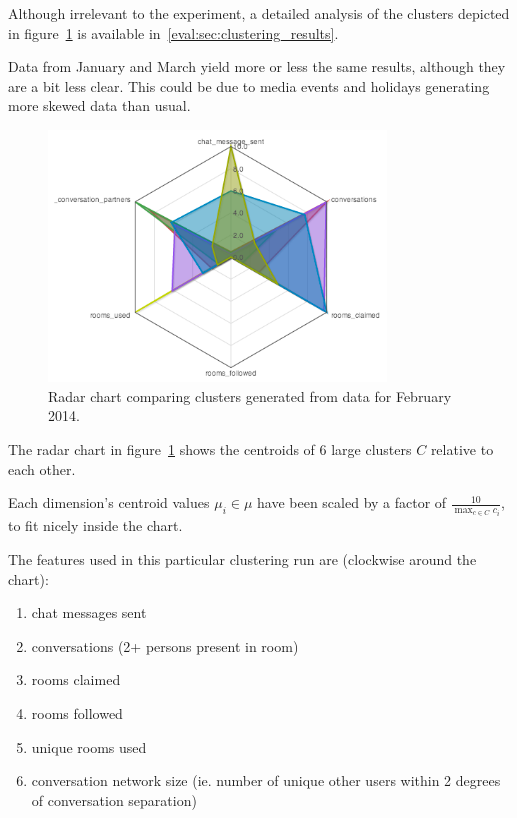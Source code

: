 Although irrelevant to the experiment, a detailed analysis of the clusters depicted in figure~\ref{fig:radar-clusters-february} is available in~\ref{eval:sec:clustering_results}.

Data from January and March yield more or less the same results, although they are a bit less clear. This could be due to media events and holidays generating more skewed data than usual.

\begin{figure}[h]
  \centering
    \includegraphics[width=0.8\textwidth]{Figures/clusterings/confluence-post/comp-02-feb}
    \caption{Radar chart comparing clusters generated from data for February 2014.}
    \label{fig:radar-clusters-february}
\end{figure}

The radar chart in figure~\ref{fig:radar-clusters-february} shows the centroids of 6 large clusters $C$ relative to each other.

Each dimension's centroid values $\mu_i \in \mu$ have been scaled by a factor of $\frac{10}{\max_{c \in C}{c_i}}$, to fit nicely inside the chart.

The features used in this particular clustering run are (clockwise around the chart):

\begin{enumerate}
  \item chat messages sent
  \item conversations (2+ persons present in room)
  \item rooms claimed
  \item rooms followed
  \item unique rooms used
  \item conversation network size (ie. number of unique other users within 2 degrees of conversation separation)
\end{enumerate}

